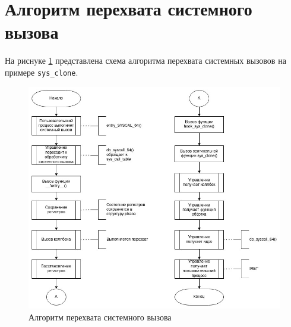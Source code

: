 \section{Алгоритм перехвата системного вызова}

На риснуке \ref{fig:ftrace_algo} представлена схема алгоритма перехвата системных вызовов на примере \texttt{sys\_clone}.

\begin{figure}[h]
	\begin{center}
		\includegraphics[scale=0.6]{img/ftrace_algo.jpg}
	\end{center}
	\caption{Алгоритм перехвата системного вызова}
	\label{fig:ftrace_algo}
\end{figure}

